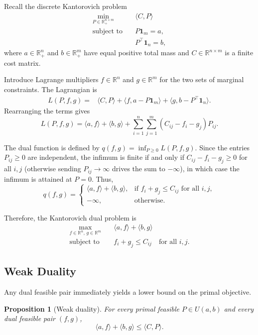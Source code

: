 \documentclass[11pt,a4paper]{article}
\newtheorem{proposition}[theorem]{Proposition}
\theoremstyle{definition}
\begin{document}
Recall the discrete Kantorovich problem
\begin{equation}
\label{eq:primal-ot}
\begin{aligned}
\min_{P\in\mathbb{R}_+^{n\times m}}
\quad & \langle C,P\rangle\\
\text{subject to}\quad
& P\mathbf{1}_m=a,\\
& P^\top\mathbf{1}_n=b,
\end{aligned}
\end{equation}
where $a\in\mathbb{R}_+^n$ and $b\in\mathbb{R}_+^m$ have equal positive
total mass and $C\in\mathbb{R}^{n\times m}$ is a finite cost matrix.

Introduce Lagrange multipliers $f\in\mathbb{R}^n$ and $g\in\mathbb{R}^m$ for the two sets of marginal constraints.
The Lagrangian is
\[
\begin{aligned}
L(P,f,g)={}&\langle C,P\rangle+\langle f,a-P\mathbf{1}_m\rangle +\langle g,b-P^\top\mathbf{1}_n\rangle.
\end{aligned}
\]
Rearranging the terms gives
\[
L(P,f,g)=\langle a,f\rangle+\langle b,g\rangle +\sum_{i=1}^n\sum_{j=1}^m (C_{ij}-f_i-g_j)P_{ij}.
\]

The dual function is defined by $q(f,g)=\inf_{P\geq0}L(P,f,g)$.
Since the entries $P_{ij}\geq 0$ are independent, the infimum is finite if and only if
$C_{ij}-f_i-g_j\geq 0$ for all $i,j$ (otherwise sending $P_{ij}\to\infty$ drives the sum
to $-\infty$), in which case the infimum is attained at $P=0$. Thus,
\[
q(f,g) = \begin{cases}
\langle a,f\rangle+\langle b,g\rangle, & \text{if } f_i+g_j\leq C_{ij}\text{ for all }i,j,\\
-\infty, & \text{otherwise}.
\end{cases}
\]

Therefore, the Kantorovich dual problem is
\begin{equation}
\label{eq:dual-ot}
\begin{aligned}
\max_{f\in\mathbb{R}^n,\,
      g\in\mathbb{R}^m}
\quad&
\langle a,f\rangle+\langle b,g\rangle\\
\text{subject to}\quad&
f_i+g_j\leq C_{ij}
\quad\text{for all }i,j.
\end{aligned}
\end{equation}

\subsection{Weak Duality}

Any dual feasible pair immediately yields a lower bound on the primal objective.
\begin{proposition}[Weak duality]
\label{prop:weak-duality}
For every primal feasible
$P\in U(a,b)$ and every dual feasible
pair $(f,g)$,
\[
\langle a,f\rangle+\langle b,g\rangle
\leq \langle C,P\rangle.
\]
\end{proposition}
\end{document}
